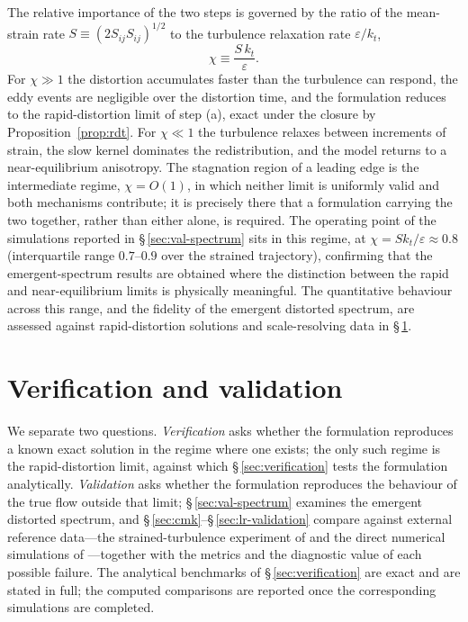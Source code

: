\documentclass[lineno]{JFM-FLM_Au}
\begin{document}
The relative importance of the two steps is governed by the ratio of the
mean-strain rate $S\equiv(2S_{ij}S_{ij})^{1/2}$ to the turbulence
relaxation rate $\varepsilon/k_t$,
\begin{equation}
  \chi \equiv \frac{S\,k_t}{\varepsilon}.
  \label{eq:chi}
\end{equation}
For $\chi\gg1$ the distortion accumulates faster than the turbulence can
respond, the eddy events are negligible over the distortion time, and the
formulation reduces to the rapid-distortion limit of step (a), exact under
the closure by Proposition~\ref{prop:rdt}. For $\chi\ll1$ the turbulence
relaxes between increments of strain, the slow kernel dominates the
redistribution, and the model returns to a near-equilibrium anisotropy. The
stagnation region of a leading edge is the intermediate regime, $\chi=
O(1)$, in which neither limit is uniformly valid and both mechanisms
contribute; it is precisely there that a formulation carrying the two
together, rather than either alone, is required. The operating point of the
simulations reported in \S\,\ref{sec:val-spectrum} sits in this regime, at
$\chi=Sk_t/\varepsilon\approx0.8$ (interquartile range $0.7$--$0.9$ over the
strained trajectory), confirming that the emergent-spectrum results
are obtained where the distinction between the rapid and near-equilibrium limits
is physically meaningful. The quantitative behaviour
across this range, and the fidelity of the emergent distorted spectrum, are
assessed against rapid-distortion solutions and scale-resolving data in
\S\,\ref{sec:validation}.


\section{Verification and validation}\label{sec:validation}

We separate two questions. \emph{Verification} asks whether the
formulation reproduces a known exact solution in the regime where one
exists; the only such regime is the rapid-distortion limit, against which
\S\,\ref{sec:verification} tests the formulation analytically. \emph{Validation}
asks whether the formulation reproduces the behaviour of the true flow
outside that limit; \S\,\ref{sec:val-spectrum} examines the emergent
distorted spectrum, and \S\,\ref{sec:cmk}--\S\,\ref{sec:lr-validation}
compare against external reference data---the strained-turbulence experiment
of \citet{ChenMeneveauKatz2006} and the direct numerical simulations of
\citet{LeeReynolds1985}---together with the metrics and the diagnostic value
of each possible failure. The analytical benchmarks of
\S\,\ref{sec:verification} are exact and are stated in full; the computed
comparisons are reported once the corresponding simulations are completed.
\end{document}
